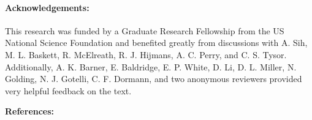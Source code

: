 \paragraph{Acknowledgements:}\label{acknowledgements}

This research was funded by a Graduate Research Fellowship from the US
National Science Foundation and benefited greatly from discussions with
A. Sih, M. L. Baskett, R. McElreath, R. J. Hijmans, A. C. Perry, and C.
S. Tysor. Additionally, A. K. Barner, E. Baldridge, E. P. White, D. Li,
D. L. Miller, N. Golding, N. J. Gotelli, C. F. Dormann, and two
anonymous reviewers provided very helpful feedback on the text.

\setlength{\parindent}{0cm}

\textbf{References:}

\setlength{\parskip}{0pt} \setlength{\parindent}{-1em}
\setlength{\leftskip}{1em}
